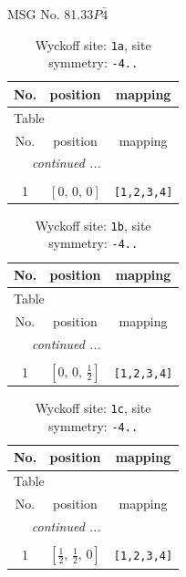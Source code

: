 \documentclass[fleqn,8pt]{jsarticle}
\begin{document}
\setcounter{MaxMatrixCols}{32}

\renewcommand{\tablename}{Table~}
\renewcommand{\figurename}{Figure~}
\begin{center}
\LARGE
MSG No. 81.33\quad$P\bar{4}$
\end{center}
\renewcommand{\arraystretch}{1.2}
\begin{longtable}{ccc}
\caption{Wyckoff site: {\tt 1a}, site symmetry: {\tt -4..}}
 \\
 \hline \hline
No. & position & mapping \\ \hline \endfirsthead

\multicolumn{2}{l}{\tablename\ \thetable{}} \\
 \hline \hline
No. & position & mapping \\ \hline \endhead

 \hline \hline
\multicolumn{2}{r}{\footnotesize\it continued ...} \\ \endfoot

 \hline \hline
\multicolumn{2}{r}{} \\ \endlastfoot

1 & $\left[ 0,\, 0,\, 0 \right]$ & {\tt [1,2,3,4]} \\
\end{longtable}
\renewcommand{\arraystretch}{1.2}
\begin{longtable}{ccc}
\caption{Wyckoff site: {\tt 1b}, site symmetry: {\tt -4..}}
 \\
 \hline \hline
No. & position & mapping \\ \hline \endfirsthead

\multicolumn{2}{l}{\tablename\ \thetable{}} \\
 \hline \hline
No. & position & mapping \\ \hline \endhead

 \hline \hline
\multicolumn{2}{r}{\footnotesize\it continued ...} \\ \endfoot

 \hline \hline
\multicolumn{2}{r}{} \\ \endlastfoot

1 & $\left[ 0,\, 0,\, \frac{1}{2} \right]$ & {\tt [1,2,3,4]} \\
\end{longtable}
\renewcommand{\arraystretch}{1.2}
\begin{longtable}{ccc}
\caption{Wyckoff site: {\tt 1c}, site symmetry: {\tt -4..}}
 \\
 \hline \hline
No. & position & mapping \\ \hline \endfirsthead

\multicolumn{2}{l}{\tablename\ \thetable{}} \\
 \hline \hline
No. & position & mapping \\ \hline \endhead

 \hline \hline
\multicolumn{2}{r}{\footnotesize\it continued ...} \\ \endfoot

 \hline \hline
\multicolumn{2}{r}{} \\ \endlastfoot

1 & $\left[ \frac{1}{2},\, \frac{1}{2},\, 0 \right]$ & {\tt [1,2,3,4]} \\
\end{longtable}
\end{document}
